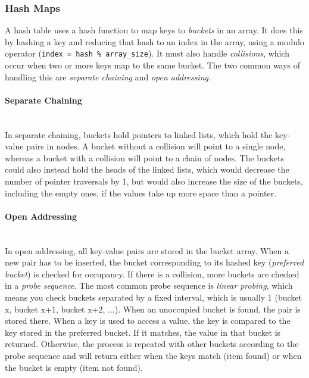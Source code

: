 \subsubsection{Hash Maps}

A hash table uses a hash function to map keys to \textit{buckets} in an array. It does this by hashing a key and reducing that hash to an index in the array, using a modulo operator (\texttt{index = hash \% array\_size}). It must also handle \textit{collisions}, which occur when two or more keys map to the same bucket. The two common ways of handling this are \textit{separate chaining} and \textit{open addressing}.

\paragraph{Separate Chaining} \hspace*{1mm} \\
In separate chaining, buckets hold pointers to linked lists, which hold the key-value pairs in nodes. A bucket without a collision will point to a single node, whereas a bucket with a collision will point to a chain of nodes. The buckets could also instead hold the heads of the linked lists, which would decrease the number of pointer traversals by 1, but would also increase the size of the buckets, including the empty ones, if the values take up more space than a pointer.

\paragraph{Open Addressing} \hspace*{1mm} \\
In open addressing, all key-value pairs are stored in the bucket array. When a new pair has to be inserted, the bucket corresponding to its hashed key (\textit{preferred bucket}) is checked for occupancy. If there is a collision, more buckets are checked in a \textit{probe sequence}. The most common probe sequence is \textit{linear probing}, which means you check buckets separated by a fixed interval, which is usually 1 (bucket x, bucket x+1, bucket x+2, ...). When an unoccupied bucket is found, the pair is stored there. When a key is used to access a value, the key is compared to the key stored in the preferred bucket. If it matches, the value in that bucket is returned. Otherwise, the process is repeated with other buckets according to the probe sequence and will return either when the keys match (item found) or when the bucket is empty (item not found).

